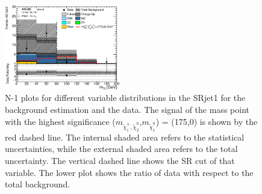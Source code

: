 \begin{figure}[htbp]
\includegraphics[width=0.45\textwidth]{data/plot/PlotsN1/all_Mt2_SRjet1_NoMt2.eps}
\caption{N-1 plots for different variable distributions in the SRjet1 for the background estimation and the data. The signal of the mass point with the highest significance ($m_{\tilde{\chi}_1^\pm , \tilde{\chi}_2^0}$,$m_{\tilde{\chi}_1^0}$) = (175,0) is shown by the red dashed line. The internal shaded area refers to the statistical uncertainties, while the external shaded area refers to the total uncertainty. The vertical dashed line shows the SR cut of that variable. The lower plot shows the ratio of data with respect to the total background.}
\label{fig:result_Nminus1_1}
\end{figure}

